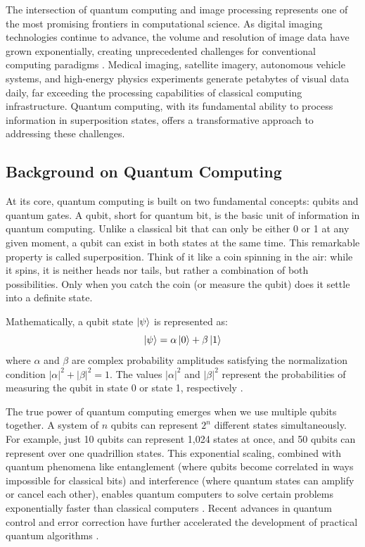 \documentclass{ipol}
\begin{document}
The intersection of quantum computing and image processing represents one of the most promising frontiers in computational science. As digital imaging technologies continue to advance, the volume and resolution of image data have grown exponentially, creating unprecedented challenges for conventional computing paradigms \cite{bib1}. Medical imaging, satellite imagery, autonomous vehicle systems, and high-energy physics experiments generate petabytes of visual data daily, far exceeding the processing capabilities of classical computing infrastructure. Quantum computing, with its fundamental ability to process information in superposition states, offers a transformative approach to addressing these challenges.

\subsection{Background on Quantum Computing}

At its core, quantum computing is built on two fundamental concepts: qubits and quantum gates. A qubit, short for quantum bit, is the basic unit of information in quantum computing. Unlike a classical bit that can only be either 0 or 1 at any given moment, a qubit can exist in both states at the same time. This remarkable property is called superposition. Think of it like a coin spinning in the air: while it spins, it is neither heads nor tails, but rather a combination of both possibilities. Only when you catch the coin (or measure the qubit) does it settle into a definite state.

Mathematically, a qubit state $\ket{\psi}$ is represented as:
\begin{equation}
\ket{\psi} = \alpha\ket{0} + \beta\ket{1}
\label{eq:qubit}
\end{equation}
where $\alpha$ and $\beta$ are complex probability amplitudes satisfying the normalization condition $|\alpha|^2 + |\beta|^2 = 1$. The values $|\alpha|^2$ and $|\beta|^2$ represent the probabilities of measuring the qubit in state 0 or state 1, respectively \cite{bib2}.

The true power of quantum computing emerges when we use multiple qubits together. A system of $n$ qubits can represent $2^n$ different states simultaneously. For example, just 10 qubits can represent 1,024 states at once, and 50 qubits can represent over one quadrillion states. This exponential scaling, combined with quantum phenomena like entanglement (where qubits become correlated in ways impossible for classical bits) and interference (where quantum states can amplify or cancel each other), enables quantum computers to solve certain problems exponentially faster than classical computers \cite{bib3,bib4}. Recent advances in quantum control and error correction have further accelerated the development of practical quantum algorithms \cite{bib5,bib6,bib7,bib8}.
\end{document}
